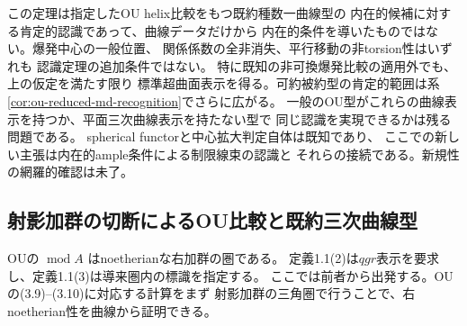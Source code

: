 \begin{remark}\label{rem:ou-smooth-elliptic-scope}
この定理は指定したOU helix比較をもつ既約種数一曲線型の
内在的候補に対する肯定的認識であって、曲線データだけから
内在的条件を導いたものではない。爆発中心の一般位置、
関係係数の全非消失、平行移動の非torsion性はいずれも
認識定理の追加条件ではない。
特に既知の非可換爆発比較の適用外でも、上の仮定を満たす限り
標準超曲面表示を得る。可約被約型の肯定的範囲は系\ref{cor:ou-reduced-md-recognition}でさらに広がる。
一般のOU型がこれらの曲線表示を持つか、平面三次曲線表示を持たない型で
同じ認識を実現できるかは残る問題である。
spherical functorと中心拡大判定自体は既知であり、
ここでの新しい主張は内在的ample条件による制限線束の認識と
それらの接続である。新規性の網羅的確認は未了。
\end{remark}

\subsection{射影加群の切断によるOU比較と既約三次曲線型}
\label{subsec:ou-perfect-tail-comparison}

OU\cite[\S2]{OU}の $\operatorname{mod} A$ はnoetherianな右加群の圏である。
定義1.1(2)は$qgr$表示を要求し、定義1.1(3)は導来圏内の標識を指定する。
ここでは前者から出発する。OUの(3.9)--(3.10)に対応する計算をまず
射影加群の三角圏で行うことで、右noetherian性を曲線から証明できる。

